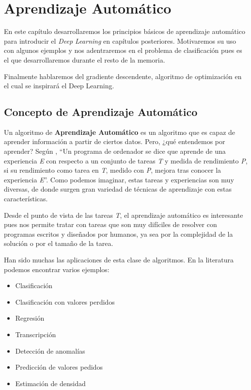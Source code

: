 \chapter{Aprendizaje Automático}

	En este capítulo desarrollaremos los principios básicos de aprendizaje automático para introducir el \textit{Deep Learning} en capítulos posteriores. Motivaremos su uso con algunos ejemplos y nos adentraremos en el problema de clasificación pues es el que desarrollaremos durante el resto de la memoria. 
	
	Finalmente hablaremos del gradiente descendente, algoritmo de optimización en el cual se inspirará el Deep Learning.
	
	
\section{Concepto de Aprendizaje Automático}\label{introap}

	Un algoritmo de \textbf{Aprendizaje Automático} es un algoritmo que es capaz de aprender información a partir de ciertos datos.  Pero, ¿qué entendemos por aprender? Según \cite{mitchell}, ``Un programa de ordenador se dice que aprende de una experiencia \textit{E} con respecto a un conjunto de tareas \textit{T} y medida de rendimiento \textit{P}, si su rendimiento como tarea en \textit{T}, medido con \textit{P}, mejora tras conocer la experiencia \textit{E}''. Como podemos imaginar, estas tareas y experiencias son muy diversas, de donde surgen gran variedad de técnicas de aprendizaje con estas características.
	
	Desde  el punto de vista de las tareas \textit{T}, el aprendizaje automático es interesante pues nos permite tratar con tareas que son muy difíciles de resolver con programas escritos y diseñados por humanos, ya sea por la complejidad de la solución o por el tamaño de la tarea.
	
	Han sido muchas las aplicaciones de esta clase de algoritmos. En la literatura podemos encontrar varios ejemplos:
	
	\begin{itemize}
		\item Clasificación
		\item Clasificación con valores perdidos
		\item Regresión
		\item Transcripción
		\item Detección de anomalías
		\item Predicción de valores pedidos
		\item Estimación de densidad
	\end{itemize}
	
